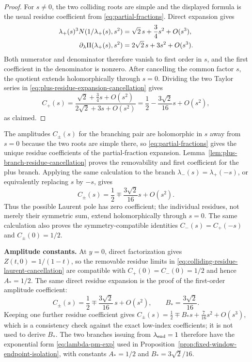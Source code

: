 \begin{proof}
For $s\ne0$, the two colliding roots are simple and the displayed formula is the usual residue coefficient from \eqref{eq:partial-fractions}.
Direct expansion gives
\begin{align}
\lambda_+(s)^3 N(1/\lambda_+(s),s^2)
&=
\sqrt2\,s+\frac34s^2+O(s^3),\notag\\
\partial_\lambda\Pi(\lambda_+(s),s^2)
&=
2\sqrt2\,s+3s^2+O(s^3).
\label{eq:plus-residue-expansion-cancellation}
\end{align}
Both numerator and denominator therefore vanish to first order in $s$, and the first coefficient in the denominator is nonzero.
After cancelling the common factor $s$, the quotient extends holomorphically through $s=0$.
Dividing the two Taylor series in \eqref{eq:plus-residue-expansion-cancellation} gives
\[
C_+(s)
=
\frac{\sqrt2+\frac34s+O(s^2)}{2\sqrt2+3s+O(s^2)}
=
\frac12-\frac{3\sqrt2}{16}s+O(s^2),
\]
as claimed.
\end{proof}

The amplitudes $C_\pm(s)$ for the branching pair are holomorphic in $s$ away from $s=0$ because the two roots are simple there, so \eqref{eq:partial-fractions} gives the unique residue coefficients of the partial-fraction expansion.
Lemma~\ref{lem:plus-branch-residue-cancellation} proves the removability and first coefficient for the plus branch.
Applying the same calculation to the branch \(\lambda_-(s)=\lambda_+(-s)\), or equivalently replacing $s$ by $-s$, gives
\begin{equation}\label{eq:colliding-residue-laurent-cancellation}
C_\pm(s)
=
\frac12\mp\frac{3\sqrt2}{16}s+O(s^2).
\end{equation}
Thus the possible Laurent pole has zero coefficient; the individual residues, not merely their symmetric sum, extend holomorphically through $s=0$.
The same calculation also proves the symmetry-compatible identities $C_-(s)=C_+(-s)$ and $C_\pm(0)=1/2$.

\textbf{Amplitude constants.}
At $y=0$, direct factorization gives $Z(t,0)=1/(1-t)$, so the removable residue limits in \eqref{eq:colliding-residue-laurent-cancellation} are compatible with $C_+(0)=C_-(0)=1/2$ and hence $A_*=1/2$.
The same direct residue expansion is the proof of the first-order amplitude coefficient:
\begin{equation}\label{eq:C-plus-minus}
C_\pm(s)
=
\frac12\mp \frac{3\sqrt2}{16}\,s+O(s^2),
\qquad
B_*=\frac{3\sqrt2}{16}.
\end{equation}
Keeping one further residue coefficient gives $C_\pm(s)=\tfrac12\mp B_*s+\tfrac{7}{16}s^2+O(s^3)$, which is a consistency check against the exact low-index coefficients; it is not used to derive $B_*$.
The two branches issuing from $\lambda_{\mathrm{end}}=1$ therefore have the exponential form \eqref{eq:lambda-pm-exp} used in Proposition~\ref{prop:fixed-window-endpoint-isolation}, with constants $A_*=1/2$ and $B_*=3\sqrt2/16$.

